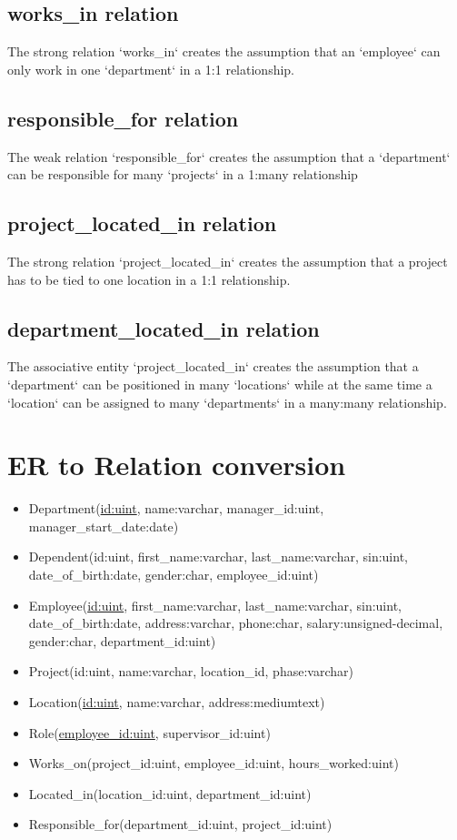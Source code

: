 \documentclass[fleqn, 11pt,letterpaper]{article}
\begin{document}
\subsection{works\_in relation}
The strong relation `works\_in` creates the assumption that an `employee` can only work in one `department` in a 1:1 relationship.
\subsection{responsible\_for relation}
	The weak relation `responsible\_for` creates the assumption that a `department` can be responsible for many `projects` in a 1:many relationship
\subsection{project\_located\_in relation}
The strong relation `project\_located\_in` creates the assumption that a project has to be tied to one location in a 1:1 relationship.
\subsection{department\_located\_in relation}
The associative entity `project\_located\_in` creates the assumption that a `department` can be positioned in many `locations` while at the same time a `location` can be assigned to many `departments` in a many:many relationship.

\pagebreak

\section{ER to Relation conversion }
\begin{itemize}[]

	\item 	Department(\uline{id:uint}, name:varchar, manager\_id:uint, manager\_start\_date:date)
	\item 	Dependent(id:uint, first\_name:varchar, last\_name:varchar, sin:uint, date\_of\_birth:date, gender:char, employee\_id:uint)
	\item 	Employee(\uline{id:uint}, first\_name:varchar, last\_name:varchar, sin:uint, date\_of\_birth:date, address:varchar, phone:char, salary:unsigned-decimal, gender:char, department\_id:uint)
		\item Project(id:uint, name:varchar, location\_id, phase:varchar)
		\item Location(\uline{id:uint}, name:varchar, address:mediumtext)
		\item Role(\uline{employee\_id:uint}, supervisor\_id:uint)
		\item Works\_on(project\_id:uint, employee\_id:uint, hours\_worked:uint)
	\item 	Located\_in(location\_id:uint, department\_id:uint)
	\item 	Responsible\_for(department\_id:uint, project\_id:uint)
\end{itemize}
\pagebreak
\end{document}
